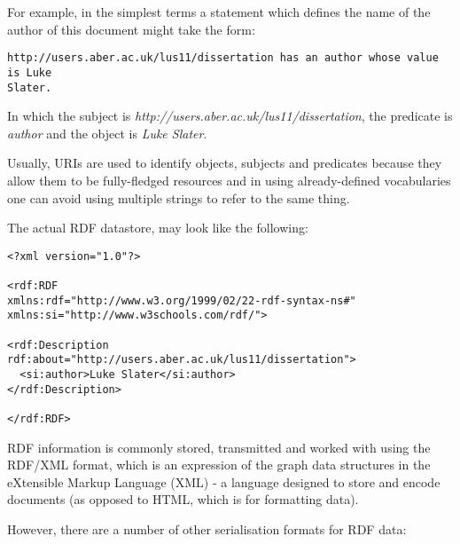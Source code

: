 \documentclass{article}
\begin{document}
For example, in the simplest terms a statement which defines the name of the author of
this document might take the form:

\begin{lstlisting}
http://users.aber.ac.uk/lus11/dissertation has an author whose value is Luke
Slater.
\end{lstlisting}

In which the subject is \emph{http://users.aber.ac.uk/lus11/dissertation}, the
predicate is \emph{author} and the object is \emph{Luke Slater}.

Usually, URIs are used to identify objects, subjects and predicates because they
allow them to be fully-fledged resources and in using already-defined
vocabularies one can avoid using multiple strings to refer to the same thing.

The actual RDF datastore, may look like the following:

\begin{lstlisting}
<?xml version="1.0"?>

<rdf:RDF
xmlns:rdf="http://www.w3.org/1999/02/22-rdf-syntax-ns#"
xmlns:si="http://www.w3schools.com/rdf/">

<rdf:Description rdf:about="http://users.aber.ac.uk/lus11/dissertation">
  <si:author>Luke Slater</si:author>
</rdf:Description>

</rdf:RDF> 
\end{lstlisting}

RDF information is commonly stored, transmitted and worked with using the
RDF/XML format, which is an expression of the graph data structures in the
eXtensible Markup Language (XML) - a language designed to store and encode
documents (as opposed to HTML, which is for formatting data). 

However, there are a number of other serialisation formats for RDF data:
\end{document}
